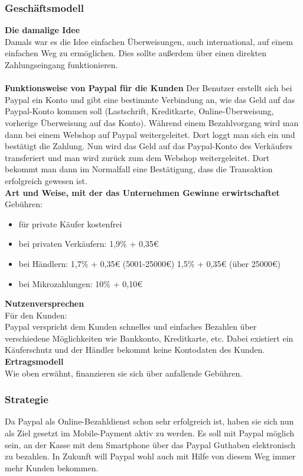 \subsubsection{Geschäftsmodell}
\textbf{Die damalige Idee}\\
Damals war es die Idee einfachen Überweisungen, auch international, auf einem einfachen Weg zu ermöglichen. Dies sollte außerdem über einen direkten Zahlungseingang funktionieren.\\
\\
\textbf{Funktionsweise von Paypal für die Kunden}
Der Benutzer erstellt sich bei Paypal ein Konto und gibt eine bestimmte Verbindung an, wie das Geld auf das Paypal-Konto kommen soll (Lastschrift, Kreditkarte, Online-Überweisung, vorherige Überweisung auf das Konto). Während einem Bezahlvorgang wird man dann bei einem Webshop auf Paypal weitergeleitet. Dort loggt man sich ein und bestätigt die Zahlung. Nun wird das Geld auf das Paypal-Konto des Verkäufers transferiert und man wird zurück zum dem Webshop weitergeleitet. Dort bekommt man dann im Normalfall eine Bestätigung, dass die Transaktion erfolgreich gewesen ist.\\
\textbf{Art und Weise, mit der das Unternehmen Gewinne erwirtschaftet}\\
Gebühren:
\begin{itemize}
\item für private Käufer kostenfrei
\item bei privaten Verkäufern: 1,9\% + 0,35\euro{}
\item bei Händlern: 1,7\% + 0,35\euro{} (5001-25000\euro{}) 1,5\% + 0,35\euro{} (über 25000\euro{})
\item bei Mikrozahlungen: 10\% + 0,10\euro{}
\end{itemize}
\textbf{Nutzenversprechen}\\
Für den Kunden:\\
Paypal verspricht dem Kunden schnelles und einfaches Bezahlen über verschiedene Möglichkeiten wie Bankkonto, Kreditkarte, etc. Dabei existiert ein Käuferschutz und der Händler bekommt keine Kontodaten des Kunden.\\
\textbf{Ertragsmodell}\\
Wie oben erwähnt, finanzieren sie sich über anfallende Gebühren.
\subsubsection{Strategie}
Da Paypal als Online-Bezahldienst schon sehr erfolgreich ist, haben sie sich nun als Ziel gesetzt im Mobile-Payment aktiv zu werden. Es soll mit Paypal möglich sein, an der Kasse mit dem Smartphone über das Paypal Guthaben elektronisch zu bezahlen. In Zukunft will Paypal wohl auch mit Hilfe von diesem Weg immer mehr Kunden bekommen.
